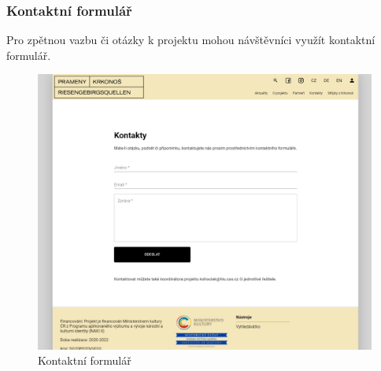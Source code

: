 \subsubsection{Kontaktní formulář}
Pro zpětnou vazbu či otázky k projektu mohou návštěvníci využít kontaktní formulář.
\begin{figure}[H]
	\centering
	\includegraphics[width=.8\linewidth]{img/contactScene.png}
	\caption{Kontaktní formulář}
\end{figure}

\pagebreak
